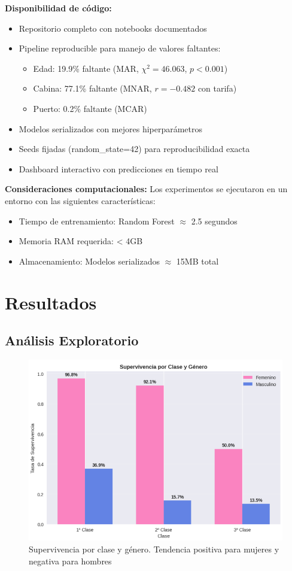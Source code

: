 \documentclass[conference]{IEEEtran}
\begin{document}
\textbf{Disponibilidad de código:}
\begin{itemize}
\item Repositorio completo con notebooks documentados
\item Pipeline reproducible para manejo de valores faltantes:
\begin{itemize}
\item Edad: 19.9\% faltante (MAR, $\chi^2 = 46.063$, $p < 0.001$)
\item Cabina: 77.1\% faltante (MNAR, $r = -0.482$ con tarifa)
\item Puerto: 0.2\% faltante (MCAR)
\end{itemize}
\item Modelos serializados con mejores hiperparámetros
\item Seeds fijadas (random\_state=42) para reproducibilidad exacta
\item Dashboard interactivo con predicciones en tiempo real
\end{itemize}

\textbf{Consideraciones computacionales:}
Los experimentos se ejecutaron en un entorno con las siguientes características:
\begin{itemize}
\item Tiempo de entrenamiento: Random Forest $\approx$ 2.5 segundos
\item Memoria RAM requerida: < 4GB
\item Almacenamiento: Modelos serializados $\approx$ 15MB total
\end{itemize}

\section{Resultados}

\subsection{Análisis Exploratorio}

\begin{figure}[htbp]
\centering
\includegraphics[width=\linewidth]{figures/super_genero_clase.png}
\caption{Supervivencia por clase y género. Tendencia positiva para mujeres y negativa para hombres}
\label{fig:super_genero_clase}
\end{figure}
\end{document}
